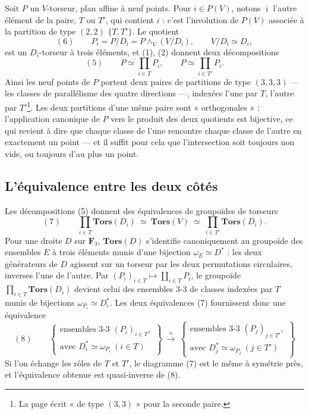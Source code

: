 \documentclass[11pt,a4paper]{article}
\begin{document}
Soit $P$ un $V$-torseur, plan affine à neuf points. Pour $i \in P(V)$, notons
$\bar\imath$ l'autre élément de la paire, $T$ ou $T'$, qui contient $i$ : c'est
l'involution de $P(V)$ associée à la partition de type $(2,2)$ $\{T, T'\}$. Le
quotient
\[
(6) \qquad P_i = P/D_{\bar\imath} = P \wedge_V (V/D_{\bar\imath}), \qquad V/D_{\bar\imath} \simeq D_i ,
\]
est un $D_i$-torseur à trois éléments, et (1), (2) donnent deux décompositions
\[
(5) \qquad P \simeq \prod_{i \in T} P_i, \qquad P \simeq \prod_{i \in T'} P_i .
\]
Ainsi les neuf points de $P$ portent deux paires de partitions de type $(3,3,3)$
— les classes de parallélisme des quatre directions —, indexées l'une par $T$,
l'autre par $T'$\footnote{La page écrit « de type $(3,3)$ » pour la seconde paire.}.
Les deux partitions d'une même paire sont « orthogonales » : l'application
canonique de $P$ vers le produit des deux quotients est bijective, ce qui revient
à dire que chaque classe de l'une rencontre chaque classe de l'autre en exactement
un point — et il suffit pour cela que l'intersection soit toujours non vide, ou
toujours d'au plus un point.

\subsection*{L'équivalence entre les deux côtés}

Les décompositions (5) donnent des équivalences de groupoïdes de torseurs
\[
(7) \qquad \prod_{i \in T} \mathbf{Tors}(D_i) \ \simeq\ \mathbf{Tors}(V) \ \simeq\
\prod_{i \in T'} \mathbf{Tors}(D_i) .
\]
Pour une droite $D$ sur $\mathbf{F}_3$, $\mathbf{Tors}(D)$ s'identifie canoniquement au
groupoïde des ensembles $E$ à trois éléments munis d'une bijection
$\omega_E \simeq D^{*}$ : les deux générateurs de $D$ agissent sur un torseur par
les deux permutations circulaires, inverses l'une de l'autre. Par
$(P_i)_{i \in T} \mapsto \coprod_{i \in T} P_i$, le groupoïde
$\prod_{i \in T} \mathbf{Tors}(D_i)$ devient celui des ensembles 3-3 de classes
indexées par $T$ munis de bijections $\omega_{P_i} \simeq D_i^{*}$. Les deux
équivalences (7) fournissent donc une équivalence
\[
(8) \qquad
\left\{\begin{array}{l}
\text{ensembles 3-3 } (P_i)_{i \in T}, \\
\text{avec } D_i^{*} \simeq \omega_{P_i} \ (i \in T)
\end{array}\right\}
\ \xrightarrow{\ \simeq\ }\
\left\{\begin{array}{l}
\text{ensembles 3-3 } (P_j)_{j \in T'}, \\
\text{avec } D_j^{*} \simeq \omega_{P_j} \ (j \in T')
\end{array}\right\}
\]
Si l'on échange les rôles de $T$ et $T'$, le diagramme (7) est le même à symétrie
près, et l'équivalence obtenue est quasi-inverse de (8).
\end{document}
